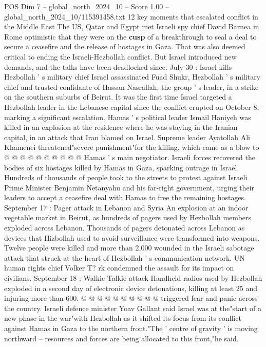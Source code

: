 \begin{textsample}{POS Dim 7 – global\_north\_2024\_10 – Score 1.00 – global\_north\_2024\_10/115391458.txt}  \label{ex:f7_pos_416}
12 key moments that escalated conflict in the Middle East The US, Qatar and Egypt met Israeli spy chief David Barnea in Rome optimistic that they were on the \textbf{cusp} of a breakthrough to seal a deal to secure a ceasefire and the release of hostages in Gaza.
That was also deemed critical to ending the Israeli-Hezbollah conflict.
But Israel introduced new demands, and the talks have been deadlocked since.
July 30 : Israel kills Hezbollah ' s military chief Israel assassinated Fuad Shukr, Hezbollah ' s military chief and trusted confidante of Hassan Nasrallah, the group ' s leader, in a strike on the southern suburbs of Beirut.
It was the first time Israel targeted a Hezbollah leader in the Lebanese capital since the conflict erupted on October 8, marking a significant escalation.
Hamas ' s political leader Ismail Haniyeh was killed in an explosion at the residence where he was staying in the Iranian capital, in an attack that Iran blamed on Israel.
Supreme leader Ayatollah Ali Khamenei threatened"severe punishment"for the killing, which came as a blow to @ @ @ @ @ @ @ @ @ @ Hamas ' s main negotiator.
Israeli forces recovered the bodies of six hostages killed by Hamas in Gaza, sparking outrage in Israel.
Hundreds of thousands of people took to the streets to protest against Israeli Prime Minister Benjamin Netanyahu and his far-right government, urging their leaders to accept a ceasefire deal with Hamas to free the remaining hostages.
September 17 : Pager attack in Lebanon and Syria An explosion at an indoor vegetable market in Beirut, as hundreds of pagers used by Hezbollah members exploded across Lebanon.
Thousands of pagers detonated across Lebanon as devices that Hizbollah used to avoid surveillance were transformed into weapons.
Twelve people were killed and more than 2,000 wounded in the Israeli sabotage attack that struck at the heart of Hezbollah ' s communication network.
UN human rights chief Volker T? rk condemned the assault for its impact on civilians.
September 18 : Walkie-Talkie attack Handheld radios used by Hezbollah exploded in a second day of electronic device detonations, killing at least 25 and injuring more than 600. @ @ @ @ @ @ @ @ @ @ triggered fear and panic across the country.
Israeli defence minister Yoav Gallant said Israel was at the"start of a new phase in the war"with Hezbollah as it shifted its focus from its conflict against Hamas in Gaza to the northern front."The ' centre of gravity ' is moving northward -- resources and forces are being allocated to this front,"he said.

\end{textsample}
